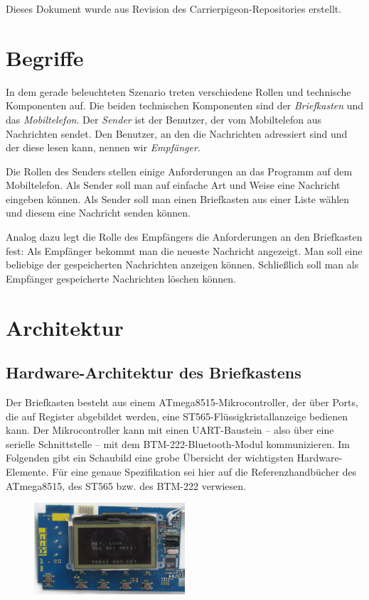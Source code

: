 \documentclass[ngerman]{article}
\begin{document}
Dieses Dokument wurde aus Revision \texttt{} des
Carrierpigeon-Repositories erstellt.

\section{Begriffe}

In dem gerade beleuchteten Szenario treten verschiedene Rollen und technische
Komponenten auf. Die beiden technischen Komponenten sind der
\textit{Briefkasten} und das \textit{Mobiltelefon}. Der \textit{Sender} ist der
Benutzer, der vom Mobiltelefon aus Nachrichten sendet. Den Benutzer, an den die
Nachrichten adressiert sind und der diese lesen kann, nennen wir
\textit{Empfänger}.

Die Rollen des Senders stellen einige Anforderungen an das Programm auf dem
Mobiltelefon. Als Sender soll man auf einfache Art und Weise eine Nachricht
eingeben können. Als Sender soll man einen Briefkasten aus einer Liste wählen
und diesem eine Nachricht senden können.

Analog dazu legt die Rolle des Empfängers die Anforderungen an den Briefkasten
fest: Als Empfänger bekommt man die neueste Nachricht an\-gezeigt. Man soll
eine beliebige der gespeicherten Nachrichten anzeigen können. Schließlich soll
man als Empfänger gespeicherte Nachrichten löschen können.

\section{Architektur}

\subsection{Hardware-Architektur des Briefkastens}

Der Briefkasten besteht aus einem ATmega8515-Mikrocontroller, der über Ports,
die auf Register abgebildet werden, eine ST565-Flüssigkristallanzeige bedienen
kann. Der Mikrocontroller kann mit einen UART-Baustein -- also über eine serielle
Schnittstelle -- mit dem BTM-222-Bluetooth-Modul kommunizieren. Im Folgenden
gibt ein Schaubild eine grobe Übersicht der wichtigsten Hardware-Elemente. Für
eine genaue Spezifikation sei hier auf die Referenzhandbücher des ATmega8515,
des ST565 bzw. des BTM-222 verwiesen.

\begin{figure}[h!] \begin{center}
    \includegraphics[width=0.5\textwidth]{media/board}
\end{center} \end{figure}
\end{document}
